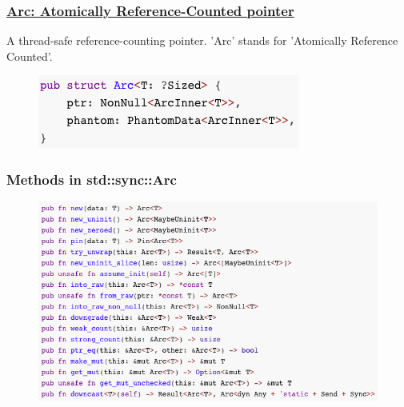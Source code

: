 % 
% 
% 
% 
\begin{frame}[fragile]
    \frametitle{\href{https://doc.rust-lang.org/std/sync/struct.Arc.html}{Arc: Atomically Reference-Counted pointer}}

A thread-safe reference-counting pointer. 'Arc' stands for 'Atomically Reference Counted'.

    \begin{figure}
    \includegraphics[width=0.8\linewidth]{figs/struct-arc.png}
    \end{figure}

\end{frame}
% 
% 
% 
% 
% 
% 
\begin{frame}[fragile]
    \frametitle{Methods in std::sync::Arc}
    \begin{figure}
    \includegraphics[width=0.8\linewidth]{figs/methods-arc.png}
    \end{figure}

\end{frame}
